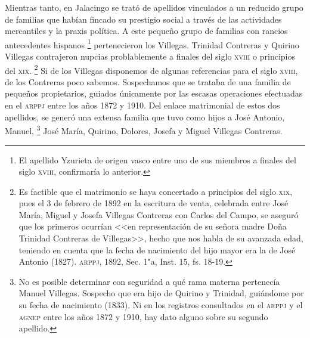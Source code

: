 \documentclass[14pt,twoside,final]{extbook} %
\let\oldfootnote\footnote
\renewcommand\footnote[1]{%
\oldfootnote{\hspace{1mm}#1}}
\begin{document}
Mientras tanto, en Jalacingo se trató de apellidos vinculados a un reducido grupo de familias que habían fincado su prestigio social a través de las actividades mercantiles y la praxis política. A este pequeño grupo de familias con rancios antecedentes hispanos\footnote{El apellido Yzurieta de origen vasco entre uno de sus miembros a finales del siglo \textsc{xviii}, confirmaría lo anterior.} pertenecieron los Villegas. Trinidad Contreras y Quirino Villegas contrajeron nupcias problablemente a finales del siglo \textsc{xviii} o principios del \textsc{xix}.\footnote{Es factible que el matrimonio se haya concertado a principios del siglo \textsc{xix}, pues el 3 de febrero de 1892 en la escritura de venta, celebrada entre José María, Miguel y Josefa Villegas Contreras con Carlos del Campo, se aseguró que los primeros ocurrían <<en representación de su señora madre Doña Trinidad Contreras de Villegas>>, hecho que nos habla de su avanzada edad, teniendo en cuenta que la fecha de nacimiento del hijo mayor era la de José Antonio (1827). \textsc{arppj}, 1892, Sec. 1"a, Inst. 15, fs. 18-19.} Si de los Villegas disponemos de algunas referencias para el siglo \textsc{xviii}, de los Contreras poco sabemos. Sospechamos que se trataba de una familia de pequeños propietarios, guiados únicamente por las escasas operaciones efectuadas en el \textsc{arppj} entre los años 1872 y 1910. Del enlace matrimonial de estos dos apellidos, se generó una extensa familia que tuvo como hijos a José Antonio, Manuel,\footnote{No es posible determinar con seguridad a qué rama materna pertenecía Manuel Villegas. Sospecho que era hijo de Quirino y Trinidad, guiándome por su fecha de nacimiento (1833). Ni en los registros consultados en el \textsc{arppj} y el \textsc{agnep} entre los años 1872 y 1910, hay dato alguno sobre su segundo apellido.} José María, Quirino, Dolores, Josefa y Miguel Villegas Contreras.
\end{document}
